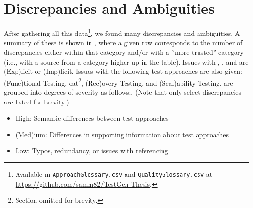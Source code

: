 \section{Discrepancies and Ambiguities}
\label{discrep}


After gathering all this data\footnote{Available in \texttt{ApproachGlossary.csv}
      and \texttt{QualityGlossary.csv} at 
      {\url{https://github.com/samm82/TestGen-Thesis}}.}, we found many discrepancies
and ambiguities. A summary of these is shown in
, where a given row corresponds to the number of
discrepancies either within that category and/or with a ``more trusted''
category (i.e., with a source from a category higher up in the table). Issues
with , , and  are
(Exp)licit or (Imp)licit. Issues with the following test approaches are also
given: \hyperref[func-test-discrep]{(Func)tional Testing},
\hyperref[oat-discrep]{\acf{oat}\ifnotpaper\else\footnote{Section omitted for
                  brevity.}\fi}, \hyperref[recov-discrep]{(Rec)overy Testing},
and \hyperref[scal-discrep]{(Scal)ability Testing}. 
are grouped into degrees of severity as follows\ifnotpaper:\else.
(Note that only select discrepancies are listed for brevity.) \fi

\begin{itemize}
      \item High: Semantic differences between test approaches
      \item (Med)ium: Differences in supporting information about test approaches
      \item Low: Typos, redundancy, or issues with referencing
\end{itemize}

